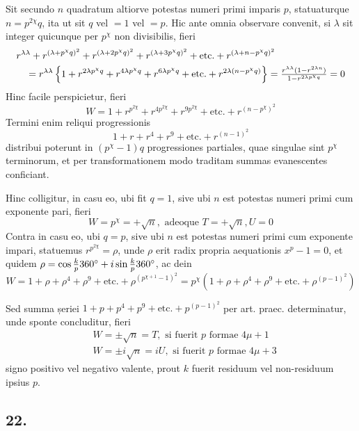 \documentclass[twoside,12pt]{memoir}
\let\oldfrac\frac
\def\frac#1#2{\mathchoice{\tfrac{#1}{#2}}{\oldfrac{#1}{#2}}{\genfrac{}{}{}{2}{#1}{#2\mathstrut}}{\genfrac{}{}{}{3}{#1}{#2\mathstrut}}}
\begin{document}
Sit secundo \(n\) quadratum altiorve potestas numeri primi imparis \(p\), statuaturque \(n=p^{2 \chi} q\), ita ut sit \(q\) vel \(=1\) vel \(=p\). Hic ante omnia observare convenit, si \(\lambda\) sit integer quicunque per \(p^{\chi}\) non divisibilis, fieri\pagebreak%
\[\begin{aligned}
& r^{\lambda \lambda}+r^{(\lambda+p^{\chi} q)^{2}}+r^{(\lambda+2 p^{\chi} q)^{2}}+r^{(\lambda+3 p^{\chi} q)^{2}}+\text{etc.}+r^{(\lambda+n-p^{\chi} q)^{2}} \\
& \quad=r^{\lambda \lambda}\left\{1+r^{2 \lambda p^{\chi} q}+r^{4 \lambda p^{\chi} q}+r^{6 \lambda p^{\chi} q}+\text{etc.}+r^{2 \lambda(n-p^{\chi} q)}\right\}=\frac{r^{\lambda \lambda}(1-r^{2 \lambda n})}{1-r^{2 \lambda p^{\chi} q}}=0
\end{aligned}\]
Hinc facile perspicietur, fieri
\[W=1+r^{p^{2 \chi}}+r^{4 p^{2 \chi}}+r^{9 p^{2 \chi}}+\text{etc.}+r^{(n-p^{\chi})^{2}}\]
Termini enim reliqui progressionis
\[1+r+r^{4}+r^{9}+\text{etc.}+r^{(n-1)^{2}}\]
distribui poterunt in \((p^{\chi}-1) q\) progressiones partiales, quae singulae sint \(p^{\chi}\) terminorum, et per transformationem modo traditam summas evanescentes conficiant.

Hinc colligitur, in casu eo, ubi fit \(q=1\), sive ubi \(n\) est potestas numeri primi cum exponente pari, fieri
\[W=p^{\chi}=+\surd n, \text{ adeoque } T=+\surd n, U=0\]
Contra in casu eo, ubi \(q=p\), sive ubi \(n\) est potestas numeri primi cum exponente impari, statuemus \(r^{p^{2\chi}}=\rho\), unde \(\rho\) erit radix propria aequationis \(x^{p}-1=0\), et quidem \(\rho=\cos \frac{k}{p} 360^{\circ}+i \sin \frac{k}{p} 360^{\circ}\), ac dein
\[W=1+\rho+\rho^{4}+\rho^{9}+\text{etc.}+\rho^{(p^{\chi+1}-1)^{2}}=p^{\chi}(1+\rho+\rho^{4}+\rho^{9}+\text{etc.}+\rho^{(p-1)^{2}})\]

Sed summa șeriei \(1+p+p^{4}+p^{9}+\text{etc.}+p^{(p-1)^{2}}\) per art. praec. determinatur, unde sponte concluditur, fieri
\[\begin{aligned}
& W= \pm \sqrt{n}=T, \text{ si fuerit } p \text{ formae } 4 \mu+1 \\
& W= \pm i \sqrt{n}=i U, \text{ si fuerit } p \text{ formae } 4 \mu+3
\end{aligned}\]
signo positivo vel negativo valente, prout \(k\) fuerit residuum vel non-residuum ipsius \(p\).

\subsection*{22.}
 
\end{document}
